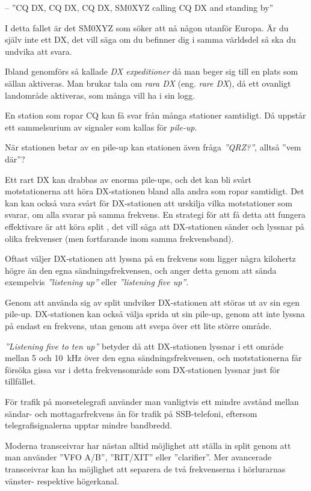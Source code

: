 -- ''CQ DX, CQ DX, CQ DX, SM0XYZ calling CQ DX and standing by''

I detta fallet är det SM0XYZ som söker att nå någon utanför Europa.
Är du själv inte ett DX, det vill säga om du befinner dig i samma världsdel så
ska du undvika att svara.

Ibland genomförs så kallade \emph{DX expeditioner} då man beger sig till en
plats som sällan aktiveras.
Man brukar tala om \emph{rara DX} (eng. \emph{rare DX}), då ett ovanligt
landområde aktiveras, som många vill ha i sin logg.

En station som ropar CQ kan få svar från många stationer samtidigt.
Då uppstår ett sammelsurium av signaler som kallas för \emph{pile-up}.

När stationen betar av en pile-up kan stationen även fråga \emph{''QRZ?''},
alltså ''vem där''?

Ett rart DX kan drabbas av enorma pile-ups, och det kan bli svårt
motstationerna att höra DX-stationen bland alla andra som ropar samtidigt.
Det kan kan också vara svårt för DX-stationen att urskilja vilka motstationer
som svarar, om alla svarar på samma frekvens.
En strategi för att få detta att fungera effektivare är att köra split
\cite{LowBandDX}, det vill säga att DX-stationen sänder och lyssnar på olika
frekvenser (men fortfarande inom samma frekvensband).

Oftast väljer DX-stationen att lyssna på en frekvens som ligger några kilohertz
högre än den egna sändningsfrekvensen, och anger detta genom att sända
exempelvis \emph{''listening up''} eller \emph{''listening five up''}.

Genom att använda sig av split undviker DX-stationen att störas ut av sin egen
pile-up.
DX-stationen kan också välja sprida ut sin pile-up, genom att inte lyssna på
endast en frekvens, utan genom att svepa över ett lite större område.

\emph{''Listening five to ten up''} betyder då att DX-stationen lyssnar i ett
område mellan 5 och 10~kHz över den egna sändningsfrekvensen, och
motstationerna får försöka gissa var i detta frekvensområde som DX-stationen
lyssnar just för tillfället.

För trafik på morsetelegrafi använder man vanligtvis ett mindre avstånd mellan
sändar- och mottagarfrekvens än för trafik på SSB-telefoni, eftersom
telegrafisignalerna upptar mindre bandbredd.

Moderna transceivrar har nästan alltid möjlighet att ställa in split genom att
man använder ''VFO A/B'', ''RIT/XIT'' eller ''clarifier''.
Mer avancerade transceivrar kan ha möjlighet att separera de två frekvenserna i
hörlurarnas vänster- respektive högerkanal.

